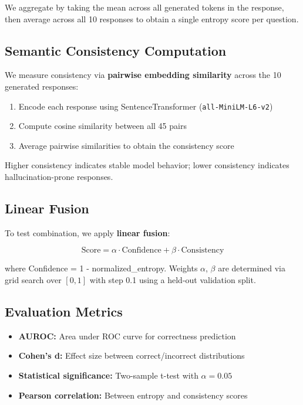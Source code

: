 We aggregate by taking the mean across all generated tokens in the response, then average across all 10 responses to obtain a single entropy score per question.

\subsection{Semantic Consistency Computation}

We measure consistency via \textbf{pairwise embedding similarity} across the 10 generated responses:

\begin{enumerate}
    \item Encode each response using SentenceTransformer (\texttt{all-MiniLM-L6-v2})
    \item Compute cosine similarity between all 45 pairs
    \item Average pairwise similarities to obtain the consistency score
\end{enumerate}

Higher consistency indicates stable model behavior; lower consistency indicates hallucination-prone responses.

\subsection{Linear Fusion}

To test combination, we apply \textbf{linear fusion}:

\begin{equation}
\text{Score} = \alpha \cdot \text{Confidence} + \beta \cdot \text{Consistency}
\end{equation}

where Confidence = 1 - normalized\_entropy. Weights $\alpha$, $\beta$ are determined via grid search over $[0, 1]$ with step 0.1 using a held-out validation split.

\subsection{Evaluation Metrics}

\begin{itemize}
    \item \textbf{AUROC:} Area under ROC curve for correctness prediction
    \item \textbf{Cohen's d:} Effect size between correct/incorrect distributions
    \item \textbf{Statistical significance:} Two-sample t-test with $\alpha=0.05$
    \item \textbf{Pearson correlation:} Between entropy and consistency scores
\end{itemize}
